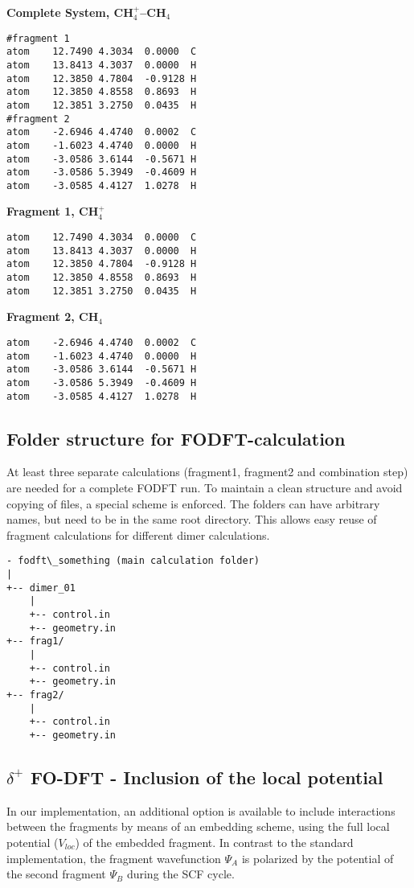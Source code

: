 \textbf{Complete System, CH$_4^+$--CH$_4$}
\begin{verbatim}
#fragment 1
atom    12.7490 4.3034  0.0000  C
atom    13.8413 4.3037  0.0000  H
atom    12.3850 4.7804  -0.9128 H
atom    12.3850 4.8558  0.8693  H
atom    12.3851 3.2750  0.0435  H
#fragment 2
atom    -2.6946 4.4740  0.0002  C
atom    -1.6023 4.4740  0.0000  H
atom    -3.0586 3.6144  -0.5671 H
atom    -3.0586 5.3949  -0.4609 H
atom    -3.0585 4.4127  1.0278  H
\end{verbatim}

\textbf{Fragment 1, CH$_4^+$}
\begin{verbatim}
atom    12.7490 4.3034  0.0000  C
atom    13.8413 4.3037  0.0000  H
atom    12.3850 4.7804  -0.9128 H
atom    12.3850 4.8558  0.8693  H
atom    12.3851 3.2750  0.0435  H
\end{verbatim}

\textbf{Fragment 2, CH$_4$}
\begin{verbatim}
atom    -2.6946 4.4740  0.0002  C
atom    -1.6023 4.4740  0.0000  H
atom    -3.0586 3.6144  -0.5671 H
atom    -3.0586 5.3949  -0.4609 H
atom    -3.0585 4.4127  1.0278  H
\end{verbatim}

\subsection*{Folder structure for FODFT-calculation}
At least three separate calculations (fragment1, fragment2 and combination step) are needed for a complete FODFT run. To maintain a clean structure and avoid copying of files, a special scheme is enforced. The folders can have arbitrary names, but need to be in the same root directory. This allows easy reuse of fragment calculations for different dimer calculations. 

\begin{verbatim}
- fodft\_something (main calculation folder)
|
+-- dimer_01
    |
    +-- control.in 
    +-- geometry.in
+-- frag1/
    |
    +-- control.in
    +-- geometry.in
+-- frag2/
    |
    +-- control.in
    +-- geometry.in

\end{verbatim}


\subsection*{$\delta^+$ FO-DFT - Inclusion of the local potential}
In our implementation, an additional option is available to include interactions between the fragments by means of an embedding scheme, using the full local potential ($V_{loc}$) of the embedded fragment. In contrast to the standard implementation, the fragment wavefunction $\Psi_{A}$ is polarized by the potential of the second fragment $\Psi_{B}$ during the SCF cycle.

